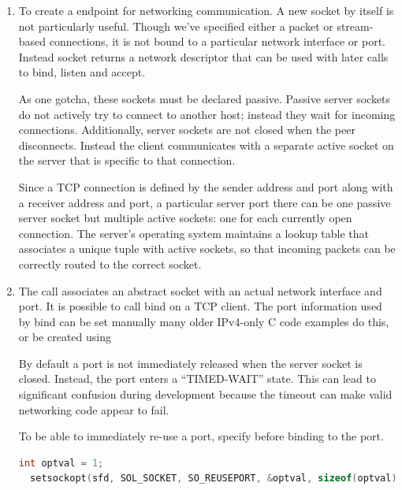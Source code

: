 \begin{enumerate}

  \item {}

  To create a endpoint for networking communication.
  A new socket by itself is not particularly useful.
  Though we've specified either a packet or stream-based connections, it is not bound to a particular network interface or port.
  Instead socket returns a network descriptor that can be used with later calls to bind, listen and accept.

  As one gotcha, these sockets must be declared passive. Passive server sockets do not actively try to connect to another host; instead they wait for incoming connections.
  Additionally, server sockets are not closed when the peer disconnects.
  Instead the client communicates with a separate active socket on the server that is specific to that connection.

  Since a TCP connection is defined by the sender address and port along with a receiver address and port, a particular server port there can be one passive server socket but multiple active sockets: one for each currently open connection.
  The server's operating system maintains a lookup table that associates a unique tuple with active sockets, so that incoming packets can be correctly routed to the correct socket.

  \item {}

  The  call associates an abstract socket with an actual network interface and port.
  It is possible to call bind on a TCP client.
  The port information used by bind can be set manually many older IPv4-only C code examples do this, or be created using 

  By default a port is not immediately released when the server socket is closed.
  Instead, the port enters a ``TIMED-WAIT'' state.
  This can lead to significant confusion during development because the timeout can make valid networking code appear to fail.

  To be able to immediately re-use a port, specify  before binding to the port.

  \begin{lstlisting}[language=C]
  int optval = 1;
  setsockopt(sfd, SOL_SOCKET, SO_REUSEPORT, &optval, sizeof(optval));


\end{lstlisting}
\end{enumerate}
